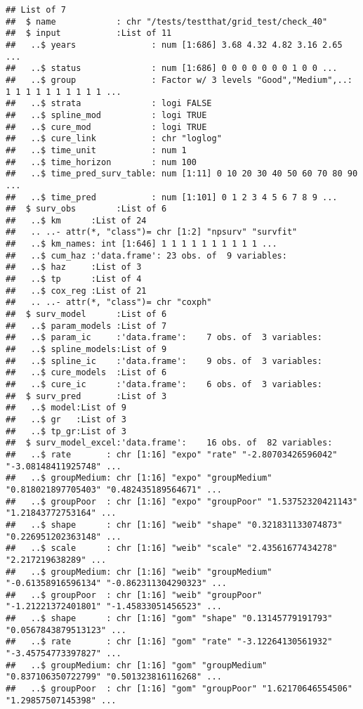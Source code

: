 \documentclass[
]{article}
\begin{document}
\begin{verbatim}
## List of 7
##  $ name            : chr "/tests/testthat/grid_test/check_40"
##  $ input           :List of 11
##   ..$ years               : num [1:686] 3.68 4.32 4.82 3.16 2.65 ...
##   ..$ status              : num [1:686] 0 0 0 0 0 0 0 1 0 0 ...
##   ..$ group               : Factor w/ 3 levels "Good","Medium",..: 1 1 1 1 1 1 1 1 1 1 ...
##   ..$ strata              : logi FALSE
##   ..$ spline_mod          : logi TRUE
##   ..$ cure_mod            : logi TRUE
##   ..$ cure_link           : chr "loglog"
##   ..$ time_unit           : num 1
##   ..$ time_horizon        : num 100
##   ..$ time_pred_surv_table: num [1:11] 0 10 20 30 40 50 60 70 80 90 ...
##   ..$ time_pred           : num [1:101] 0 1 2 3 4 5 6 7 8 9 ...
##  $ surv_obs        :List of 6
##   ..$ km      :List of 24
##   .. ..- attr(*, "class")= chr [1:2] "npsurv" "survfit"
##   ..$ km_names: int [1:646] 1 1 1 1 1 1 1 1 1 1 ...
##   ..$ cum_haz :'data.frame': 23 obs. of  9 variables:
##   ..$ haz     :List of 3
##   ..$ tp      :List of 4
##   ..$ cox_reg :List of 21
##   .. ..- attr(*, "class")= chr "coxph"
##  $ surv_model      :List of 6
##   ..$ param_models :List of 7
##   ..$ param_ic     :'data.frame':    7 obs. of  3 variables:
##   ..$ spline_models:List of 9
##   ..$ spline_ic    :'data.frame':    9 obs. of  3 variables:
##   ..$ cure_models  :List of 6
##   ..$ cure_ic      :'data.frame':    6 obs. of  3 variables:
##  $ surv_pred       :List of 3
##   ..$ model:List of 9
##   ..$ gr   :List of 3
##   ..$ tp_gr:List of 3
##  $ surv_model_excel:'data.frame':    16 obs. of  82 variables:
##   ..$ rate       : chr [1:16] "expo" "rate" "-2.80703426596042" "-3.08148411925748" ...
##   ..$ groupMedium: chr [1:16] "expo" "groupMedium" "0.818021897705403" "0.482435189564671" ...
##   ..$ groupPoor  : chr [1:16] "expo" "groupPoor" "1.53752320421143" "1.21843772753164" ...
##   ..$ shape      : chr [1:16] "weib" "shape" "0.321831133074873" "0.226951202363148" ...
##   ..$ scale      : chr [1:16] "weib" "scale" "2.43561677434278" "2.217219638289" ...
##   ..$ groupMedium: chr [1:16] "weib" "groupMedium" "-0.61358916596134" "-0.862311304290323" ...
##   ..$ groupPoor  : chr [1:16] "weib" "groupPoor" "-1.21221372401801" "-1.45833051456523" ...
##   ..$ shape      : chr [1:16] "gom" "shape" "0.13145779191793" "0.0567843879513123" ...
##   ..$ rate       : chr [1:16] "gom" "rate" "-3.12264130561932" "-3.45754773397827" ...
##   ..$ groupMedium: chr [1:16] "gom" "groupMedium" "0.837106350722799" "0.501323816116268" ...
##   ..$ groupPoor  : chr [1:16] "gom" "groupPoor" "1.62170646554506" "1.29857507145398" ...

\end{verbatim}
\end{document}
